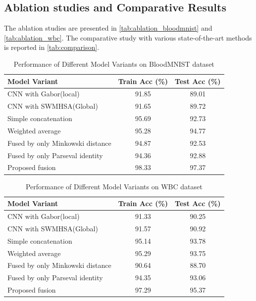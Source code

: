 \documentclass[preprint,12pt]{elsarticle}
\begin{document}
\FloatBarrier
\subsection{Ablation studies and Comparative Results}
The ablation studies are presented in \autoref{tab:ablation_bloodmnist} and \autoref{tab:ablation_wbc}. The comparative study with various state-of-the-art methods is reported in \autoref{tab:comparison}.

\begin{table}[ht!]
\centering
\caption{Performance of Different Model Variants on BloodMNIST dataset}
\label{tab:ablation_bloodmnist}
\begin{tabular}{|l|c|c|}
\hline
\textbf{Model Variant} & \textbf{Train Acc (\%)} & \textbf{Test Acc (\%)} \\ \hline

CNN with Gabor(local) & 91.85 & 89.01 \\ \hline
CNN with SWMHSA(Global) & 91.65 & 89.72 \\ \hline
Simple concatenation                  & 95.69 & 92.73 \\ \hline
Weighted average                  & 95.28 & 94.77 \\ \hline
Fused by only Minkowski distance           & 94.87 & 92.53 \\ \hline
Fused by only Parseval identity  & 94.36 & 92.88 \\ \hline
Proposed fusion  & 98.33 & 97.37 \\ \hline

\end{tabular}
\end{table}


\begin{table}[ht!]
\centering
\caption{Performance of Different Model Variants on WBC dataset}
\label{tab:ablation_wbc}
\begin{tabular}{|l|c|c|}
\hline
\textbf{Model Variant} & \textbf{Train Acc (\%)} & \textbf{Test Acc (\%)} \\ \hline

CNN with Gabor(local) & 91.33 & 90.25 \\ \hline
CNN with SWMHSA(Global) & 91.57 & 90.92 \\ \hline
Simple concatenation                  & 95.14 & 93.78 \\ \hline
Weighted average                  & 95.29 & 93.75 \\ \hline
Fused by only Minkowski distance           & 90.64 & 88.70 \\ \hline
Fused by only Parseval identity  & 94.35 & 93.06 \\ \hline
Proposed fusion  & 97.29 & 95.37 \\ \hline

\end{tabular}
\end{table}
\end{document}
